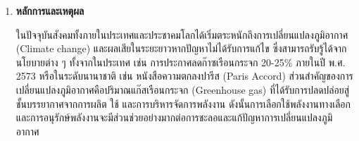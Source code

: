 \documentclass[a4paper,12pt]{article}
\begin{document}
\begin{enumerate}[label=\textbf{\arabic*},leftmargin=*]
    \item \noindent \textbf{หลักการและเหตุผล} \hfill \par
        ในปัจจุบันสังคมทั้งภายในประเทศและประชาคมโลกได้เริ่มตระหนักถึงการเปลี่ยนแปลงภูมิอากาศ (Climate change) และผลเสียในระยะยาวหากปัญหาไม่ได้รับการแก้ไข ซึ่งสามารถรับรู้ได้จากนโยบายต่าง ๆ ทั้งจากในประเทศ เช่น การประกาศลดก๊าซเรือนกระจก 20-25\% ภายในปี พ.ศ. 2573 หรือในระดับนานาชาติ เช่น หนังสือความตกลงปารีส (Paris Accord) ส่วนสำคัญของการเปลี่ยนแปลงภูมิอากาศคือปริมาณแก๊สเรือนกระจก (Greenhouse gas) ที่ได้รับการปลดปล่อยสู่ชั้นบรรยากาศจากการผลิต ใช้ และการบริหารจัดการพลังงาน ดังนั้นการเลือกใช้พลังงานทางเลือกและการอนุรักษ์พลังงานจะมีส่วนช่วยอย่างมากต่อการชะลอและแก้ปัญหาการเปลี่ยนแปลงภูมิอากาศ


\end{enumerate}
\end{document}
